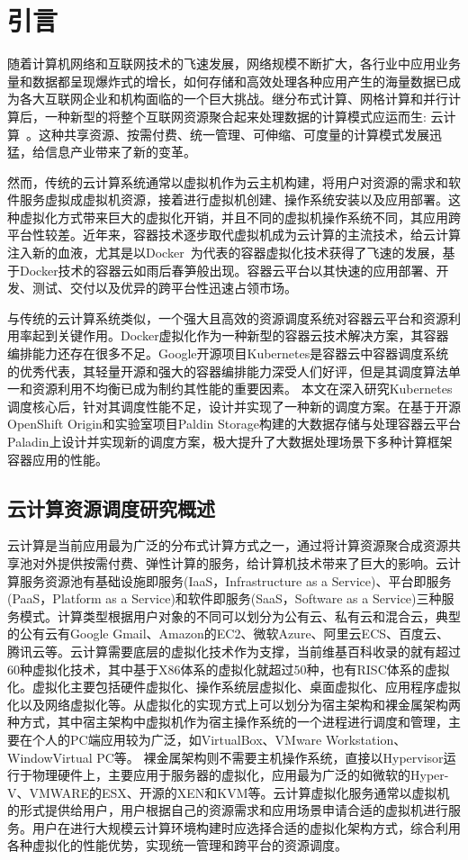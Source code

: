\chapter{引言}
随着计算机网络和互联网技术的飞速发展，网络规模不断扩大，各行业中应用业务量和数据都呈现爆炸式的增长，如何存储和高效处理各种应用产生的海量数据已成为各大互联网企业和机构面临的一个巨大挑战。继分布式计算、网格计算和并行计算后，一种新型的将整个互联网资源聚合起来处理数据的计算模式应运而生: 云计算~\cite{Hayes2008Cloud}。这种共享资源、按需付费、统一管理、可伸缩、可度量的计算模式发展迅猛，给信息产业带来了新的变革。

然而，传统的云计算系统通常以虚拟机作为云主机构建，将用户对资源的需求和软件服务虚拟成虚拟机资源，接着进行虚拟机创建、操作系统安装以及应用部署。这种虚拟化方式带来巨大的虚拟化开销，并且不同的虚拟机操作系统不同，其应用跨平台性较差。近年来，容器技术逐步取代虚拟机成为云计算的主流技术，给云计算注入新的血液，尤其是以Docker~\cite{2015Docker}为代表的容器虚拟化技术获得了飞速的发展，基于Docker技术的容器云如雨后春笋般出现。容器云平台以其快速的应用部署、开发、测试、交付以及优异的跨平台性迅速占领市场。

与传统的云计算系统类似，一个强大且高效的资源调度系统对容器云平台和资源利用率起到关键作用。Docker虚拟化作为一种新型的容器云技术解决方案，其容器编排能力还存在很多不足。Google开源项目Kubernetes是容器云中容器调度系统的优秀代表，其轻量开源和强大的容器编排能力深受人们好评，但是其调度算法单一和资源利用不均衡已成为制约其性能的重要因素。
本文在深入研究Kubernetes调度核心后，针对其调度性能不足，设计并实现了一种新的调度方案。在基于开源OpenShift Origin和实验室项目Paldin Storage构建的大数据存储与处理容器云平台Paladin上设计并实现新的调度方案，极大提升了大数据处理场景下多种计算框架容器应用的性能。

\section{云计算资源调度研究概述}
云计算是当前应用最为广泛的分布式计算方式之一，通过将计算资源聚合成资源共享池对外提供按需付费、弹性计算的服务，给计算机技术带来了巨大的影响。云计算服务资源池有基础设施即服务(IaaS，Infrastructure as a Service)、平台即服务(PaaS，Platform as a Service)和软件即服务(SaaS，Software as a Service)三种服务模式。计算类型根据用户对象的不同可以划分为公有云、私有云和混合云，典型的公有云有Google Gmail、Amazon的EC2、微软Azure、阿里云ECS、百度云、腾讯云等。云计算需要底层的虚拟化技术作为支撑，当前维基百科收录的就有超过60种虚拟化技术，其中基于X86体系的虚拟化就超过50种，也有RISC体系的虚拟化。虚拟化主要包括硬件虚拟化、操作系统层虚拟化、桌面虚拟化、应用程序虚拟化以及网络虚拟化等。从虚拟化的实现方式上可以划分为宿主架构和裸金属架构两种方式，其中宿主架构中虚拟机作为宿主操作系统的一个进程进行调度和管理，主要在个人的PC端应用较为广泛，如VirtualBox、VMware Workstation、WindowVirtual PC等。
裸金属架构则不需要主机操作系统，直接以Hypervisor运行于物理硬件上，主要应用于服务器的虚拟化，应用最为广泛的如微软的Hyper-V、VMWARE的ESX、开源的XEN和KVM等。云计算虚拟化服务通常以虚拟机的形式提供给用户，用户根据自己的资源需求和应用场景申请合适的虚拟机进行服务。用户在进行大规模云计算环境构建时应选择合适的虚拟化架构方式，综合利用各种虚拟化的性能优势，实现统一管理和跨平台的资源调度。


